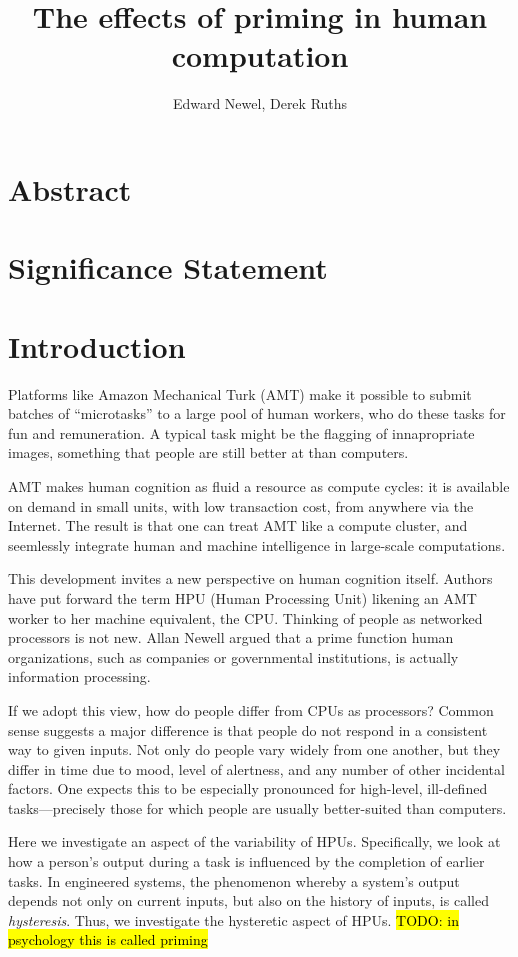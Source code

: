 \documentclass[a4paper]{report}
\title{The effects of priming in human computation}
\author{Edward Newel, Derek Ruths}
\newcommand{\td}[1]{{\color{blu}\hl{TODO: #1}}}
\begin{document}
\maketitle
\section*{Abstract}
\section*{Significance Statement}
\section*{Introduction}

Platforms like Amazon Mechanical Turk (AMT) make it possible to submit 
batches of ``microtasks'' to a large pool of human workers, who do these 
tasks for fun and remuneration.  A typical task might be the flagging of
innapropriate images, something that people are still better at than 
computers.  

AMT makes human cognition as fluid a
resource as compute cycles: it is available on demand in small units, with low 
transaction cost, from anywhere via the Internet. The result is that one can 
treat AMT like a compute cluster, and seemlessly integrate human and machine
intelligence in large-scale computations.

This development invites a new perspective on human cognition itself.  Authors 
have put forward the term HPU (Human Processing Unit) likening an AMT worker
to her machine equivalent, the CPU.  Thinking of people as networked 
processors is not new.  Allan Newell argued 
that a prime function human organizations, such as companies or 
governmental institutions, is actually information processing.  

If we adopt this view, how do people differ from CPUs as processors?  
Common sense suggests a major difference is that people do not respond 
in a consistent way to given inputs.  Not only do people vary widely from 
one another, but they differ in time due to mood, level of alertness, and 
any number of other incidental factors. One expects this to be especially 
pronounced for high-level, ill-defined tasks---precisely those for which 
people are usually better-suited than computers.  

Here we investigate an aspect of the variability of HPUs.  Specifically,
we look at how a person's output during a task is influenced by the completion
of earlier tasks.  In engineered systems, the phenomenon whereby a system's 
output depends not only on current inputs, but also on the history of inputs,
is called \textit{hysteresis}.  Thus, we investigate the hysteretic aspect
of HPUs.
\td{in psychology this is called priming}
\end{document}
